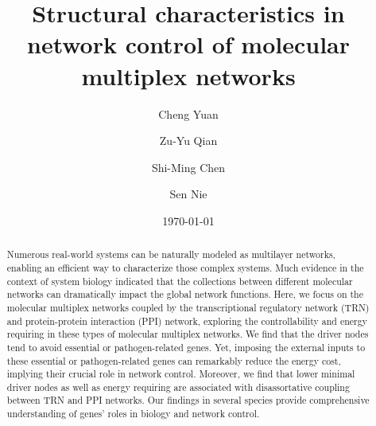 \documentclass[%
 reprint,
 amsmath,amssymb,
 aps,
]{revtex4-2}
\begin{document}

\title{Structural characteristics in network control of molecular multiplex networks}%

\author{Cheng Yuan}
\author{Zu-Yu Qian}
\author{Shi-Ming Chen}
\author{Sen Nie}%


\date{\today}%

\begin{abstract}
Numerous real-world systems can be naturally modeled as multilayer networks, enabling an efficient way to characterize those complex systems. Much evidence in the context of system biology indicated that the collections between different molecular networks can dramatically impact the global network functions. Here, we focus on the molecular multiplex networks coupled by the transcriptional regulatory network (TRN) and protein-protein interaction (PPI) network, exploring the controllability and energy requiring in these types of molecular multiplex networks. We find that the driver nodes tend to avoid essential or pathogen-related genes. Yet, imposing the external inputs to these essential or pathogen-related genes can remarkably reduce the energy cost, implying their crucial role in network control. Moreover, we find that lower minimal driver nodes as well as energy requiring are associated with disassortative coupling between TRN and PPI networks. Our findings in several species provide comprehensive understanding of genes' roles in biology and network control. 
\end{abstract}

\maketitle
\end{document}
